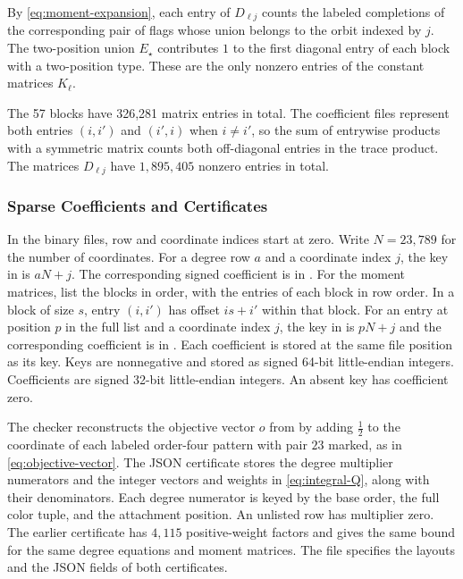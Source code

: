 By \eqref{eq:moment-expansion}, each entry of $D_{\ell j}$ counts the
labeled completions of the corresponding pair of flags whose union
belongs to the orbit indexed by $j$. The two-position union
$E_\star$ contributes $1$ to the first diagonal entry of each
block with a two-position type. These are the only nonzero
entries of the constant matrices $K_\ell$.

The 57 blocks have 326,281 matrix entries in total. The coefficient
files represent both entries $(i,i')$ and $(i',i)$ when $i\ne i'$,
so the sum of entrywise products with a symmetric matrix counts both
off-diagonal entries in the trace product. The matrices $D_{\ell j}$
have $1{,}895{,}405$ nonzero entries in total.

\subsubsection{Sparse Coefficients and Certificates}

In the binary files, row and coordinate indices start at zero. Write
$N=23{,}789$ for the number of coordinates. For a degree row $a$ and
a coordinate index $j$, the key in
 is $aN+j$. The corresponding signed coefficient
is in . For the moment matrices, list the
blocks in  order, with the entries of each block
in row order. In a block of size $s$, entry $(i,i')$ has offset
$is+i'$ within that block.
For an entry at position $p$ in the full list and a coordinate index $j$,
the key in  is $pN+j$ and the corresponding coefficient
is in . Each coefficient is stored at the same
file position as its key. Keys are nonnegative and stored as signed
64-bit little-endian integers. Coefficients are signed 32-bit
little-endian integers. An absent key has coefficient zero.

The checker reconstructs the objective vector $o$ from
 by adding $\frac{1}{2}$ to the coordinate of each
labeled order-four pattern with pair $23$ marked, as in
\eqref{eq:objective-vector}. The JSON certificate stores the
degree multiplier numerators and the integer vectors and weights in
\eqref{eq:integral-Q}, along with their denominators.
Each degree numerator is keyed by the base order, the full color
tuple, and the attachment position. An unlisted row has multiplier
zero.
The earlier certificate 
has $4{,}115$ positive-weight factors and gives the same bound
for the same degree equations and moment matrices. The file
 specifies the layouts and the
JSON fields of both certificates.
